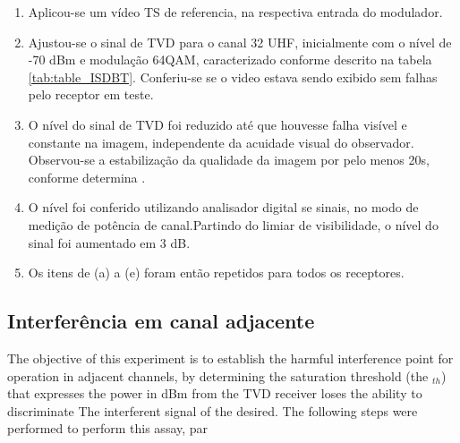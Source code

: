 \begin{enumerate}[label=(\alph*)]
    \item Aplicou-se um vídeo TS de referencia, na respectiva entrada do modulador.
    \item Ajustou-se o sinal de TVD para o canal 32 UHF, inicialmente com o nível de -70 dBm e modulação 64QAM, caracterizado conforme descrito na tabela \ref{tab:table_ISDBT}. Conferiu-se se o video estava sendo exibido sem falhas pelo receptor em teste.
	\item O nível do sinal de TVD foi reduzido até que houvesse falha visível e constante na imagem, independente da acuidade visual do observador. Observou-se a estabilização da qualidade da imagem por pelo menos 20s, conforme determina \cite{ITU_BT_1368}.
    \item O nível foi conferido utilizando analisador digital se sinais, no modo de medição de potência de canal.Partindo do limiar de visibilidade, o nível  do sinal foi aumentado em 3 dB.
    \item Os itens de (a) a (e) foram então repetidos para todos os receptores.
\end{enumerate}


\subsection{Interferência em canal adjacente}

The objective of this experiment is to establish the harmful interference point for operation in adjacent channels, by determining the saturation threshold (the $ _{th} $) that expresses the power in dBm from the TVD receiver loses the ability to discriminate The interferent signal of the desired. The following steps were performed to perform this assay, par  

